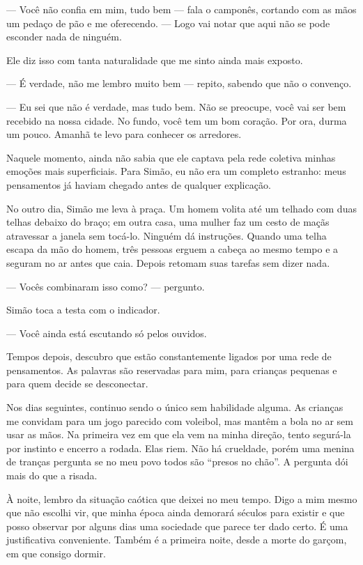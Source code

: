 — Você não confia em mim, tudo bem — fala o camponês, cortando com as mãos um pedaço de pão e me oferecendo. — Logo vai notar que aqui não se pode esconder nada de ninguém.

Ele diz isso com tanta naturalidade que me sinto ainda mais exposto.

— É verdade, não me lembro muito bem — repito, sabendo que não o convenço.

— Eu sei que não é verdade, mas tudo bem. Não se preocupe, você vai ser bem recebido na nossa cidade. No fundo, você tem um bom coração. Por ora, durma um pouco. Amanhã te levo para conhecer os arredores.

Naquele momento, ainda não sabia que ele captava pela rede coletiva minhas emoções mais superficiais. Para Simão, eu não era um completo estranho: meus pensamentos já haviam chegado antes de qualquer explicação.

\bigskip

No outro dia, Simão me leva à praça. Um homem volita até um telhado com duas telhas debaixo do braço; em outra casa, uma mulher faz um cesto de maçãs atravessar a janela sem tocá-lo. Ninguém dá instruções. Quando uma telha escapa da mão do homem, três pessoas erguem a cabeça ao mesmo tempo e a seguram no ar antes que caia. Depois retomam suas tarefas sem dizer nada.

— Vocês combinaram isso como? — pergunto.

Simão toca a testa com o indicador.

— Você ainda está escutando só pelos ouvidos.

Tempos depois, descubro que estão constantemente ligados por uma rede de pensamentos. As palavras são reservadas para mim, para crianças pequenas e para quem decide se desconectar.

Nos dias seguintes, continuo sendo o único sem habilidade alguma. As crianças me convidam para um jogo parecido com voleibol, mas mantêm a bola no ar sem usar as mãos. Na primeira vez em que ela vem na minha direção, tento segurá-la por instinto e encerro a rodada. Elas riem. Não há crueldade, porém uma menina de tranças pergunta se no meu povo todos são “presos no chão”. A pergunta dói mais do que a risada.

À noite, lembro da situação caótica que deixei no meu tempo. Digo a mim mesmo que não escolhi vir, que minha época ainda demorará séculos para existir e que posso observar por alguns dias uma sociedade que parece ter dado certo. É uma justificativa conveniente. Também é a primeira noite, desde a morte do garçom, em que consigo dormir.

